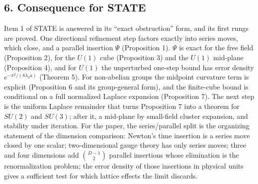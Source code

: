 \documentclass[11pt,a4paper]{article}
\begin{document}
\hypertarget{consequence-for-state}{%
\subsection{6. Consequence for STATE}\label{consequence-for-state}}

Item 1 of STATE is answered in its ``exact obstruction'' form, and its
first rungs are proved. One directional refinement step factors exactly
into series moves, which close, and a parallel insertion \(\Psi\)
(Proposition 1). \(\Psi\) is exact for the free field (Proposition 2),
for the \(U(1)\) cube (Proposition 3) and the \(U(1)\) mid-plane
(Proposition 4), and for \(U(1)\) the unperturbed one-step bound has
error density \(e^{-\pi^2/(8\lambda_3a)}\) (Theorem 5). For non-abelian
groups the midpoint curvature term is explicit (Proposition 6 and its
group-general form), and the finite-cube bound is conditional on a full
normalized Laplace expansion (Proposition 7). The next step is the
uniform Laplace remainder that turns Proposition 7 into a theorem for
\(SU(2)\) and \(SU(3)\); after it, a mid-plane by small-field cluster
expansion, and stability under iteration. For the paper, the
series/parallel split is the organizing statement of the dimension
comparison: Newton's time insertion is a series move closed by one
scalar; two-dimensional gauge theory has only series moves; three and
four dimensions add \(\binom{D-1}{2}\) parallel insertions whose
elimination is the renormalization problem; the error density of those
insertions in physical units gives a sufficient test for which lattice
effects the limit discards.
\end{document}
